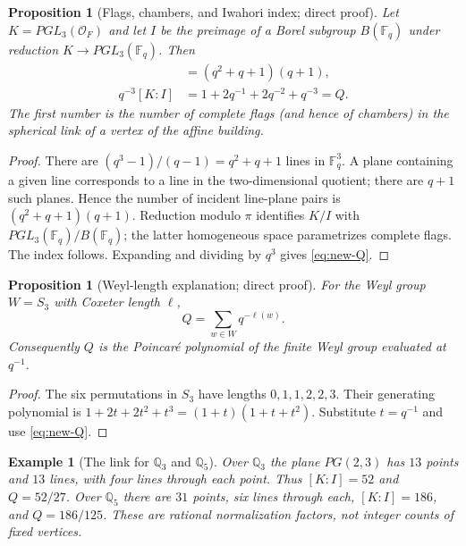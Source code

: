 \documentclass[12pt,letterpaper]{amsart}
\numberwithin{equation}{section}
\newtheorem{proposition}[theorem]{Proposition}
\newtheorem{example}[theorem]{Example}
\theoremstyle{definition}
\theoremstyle{plain}
\begin{document}
\begin{proposition}[Flags, chambers, and Iwahori index; direct proof]
\label{prop:new-Q}
Let $K=PGL_3(\mathcal O_F)$ and let $I$ be the preimage of a
Borel subgroup $B(\mathbb F_q)$ under reduction
$K\to PGL_3(\mathbb F_q)$. Then
\begin{align}
 [K:I]&=(q^2+q+1)(q+1),\label{eq:new-index}\\
 q^{-3}[K:I]
 &=1+2q^{-1}+2q^{-2}+q^{-3}
 =Q.\label{eq:new-Q}
\end{align}
The first number is the number of complete flags (and hence of
chambers) in the spherical link of a vertex of the affine building.
\end{proposition}
\begin{proof}
There are $(q^3-1)/(q-1)=q^2+q+1$ lines in
$\mathbb F_q^3$. A plane containing a given line corresponds to a
line in the two-dimensional quotient; there are $q+1$ such planes.
Hence the number of incident line-plane pairs is
$(q^2+q+1)(q+1)$.
Reduction modulo $\pi$ identifies $K/I$ with
$PGL_3(\mathbb F_q)/B(\mathbb F_q)$; the latter homogeneous space
parametrizes complete flags. The index follows. Expanding and
dividing by $q^3$ gives \eqref{eq:new-Q}.
\end{proof}

\begin{proposition}[Weyl-length explanation; direct proof]
\label{prop:new-Weyl}
For the Weyl group $W=S_3$ with Coxeter length $\ell$,
\begin{equation}\label{eq:new-poincare}
 Q=\sum_{w\in W}q^{-\ell(w)}.
\end{equation}
Consequently $Q$ is the Poincar\'e polynomial of the finite
Weyl group evaluated at $q^{-1}$.
\end{proposition}
\begin{proof}
The six permutations in $S_3$ have lengths
$0,1,1,2,2,3$. Their generating polynomial is
$1+2t+2t^2+t^3=(1+t)(1+t+t^2)$.
Substitute $t=q^{-1}$ and use \eqref{eq:new-Q}.
\end{proof}

\begin{example}[The link for $\mathbb Q_3$ and $\mathbb Q_5$]
Over $\mathbb Q_3$ the plane $PG(2,3)$ has $13$ points and
$13$ lines, with four lines through each point. Thus
$[K:I]=52$ and $Q=52/27$.
Over $\mathbb Q_5$ there are $31$ points, six lines through each,
$[K:I]=186$, and $Q=186/125$.
These are rational normalization factors, not integer counts of
fixed vertices.
\end{example}
\end{document}
